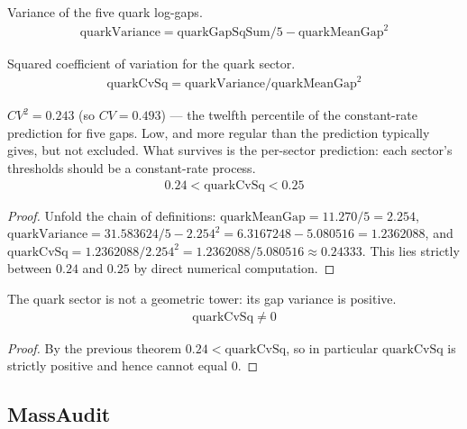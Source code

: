 \begin{definition}
Variance of the five quark log-gaps.
\begin{align*}
\text{quarkVariance} = \text{quarkGapSqSum} / 5 - \text{quarkMeanGap}^2
\end{align*}
\end{definition}

\begin{definition}
Squared coefficient of variation for the quark sector.
\begin{align*}
\text{quarkCvSq} = \text{quarkVariance} / \text{quarkMeanGap}^2
\end{align*}
\end{definition}

\begin{theorem}
$CV^2 = 0.243$ (so $CV = 0.493$) — the twelfth percentile of the constant-rate prediction for five gaps.  Low, and more regular than the prediction typically gives, but not excluded.  What survives is the per-sector prediction: each sector's thresholds should be a constant-rate process.
\begin{align*}
0.24 < \text{quarkCvSq} < 0.25
\end{align*}
\begin{proof}
Unfold the chain of definitions: $\text{quarkMeanGap}=11.270/5=2.254$, $\text{quarkVariance}=31.583624/5 - 2.254^2 = 6.3167248 - 5.080516 = 1.2362088$, and $\text{quarkCvSq}=1.2362088/2.254^2 = 1.2362088/5.080516\approx0.24333$. This lies strictly between $0.24$ and $0.25$ by direct numerical computation.
\end{proof}
\end{theorem}

\begin{theorem}
The quark sector is not a geometric tower: its gap variance is positive.
\begin{align*}
\text{quarkCvSq} \neq 0
\end{align*}
\begin{proof}
By the previous theorem $0.24<\text{quarkCvSq}$, so in particular $\text{quarkCvSq}$ is strictly positive and hence cannot equal $0$.
\end{proof}
\end{theorem}

\subsection{MassAudit}

